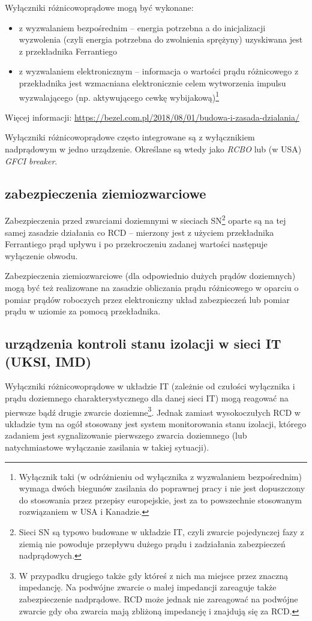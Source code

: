 Wyłączniki różnicowoprądowe mogą być wykonane:
\begin{itemize}
	\item z wyzwalaniem bezpośrednim – energia potrzebna a do inicjalizacji wyzwolenia (czyli energia potrzebna do zwolnienia sprężyny) uzyskiwana jest z przekładnika Ferrantiego
	\item z wyzwalaniem elektronicznym – informacja o wartości prądu różnicowego z przekładnika jest wzmacniana elektronicznie celem wytworzenia impulsu wyzwalającego (np. aktywującego cewkę wybijakową)\footnote{
		Wyłącznik taki (w odróżnieniu od wyłącznika z wyzwalaniem bezpośrednim) wymaga dwóch biegunów zasilania do poprawnej pracy i nie jest dopuszczony do stosowania przez przepisy europejskie,
		jest za to powszechnie stosowanym rozwiązaniem w USA i Kanadzie.
	}
\end{itemize}
Więcej informacji: \url{https://bezel.com.pl/2018/08/01/budowa-i-zasada-dzialania/}

Wyłączniki różnicowoprądowe często integrowane są z wyłącznikiem nadprądowym w jedno urządzenie.
Określane są wtedy jako \textit{RCBO} lub (w USA) \textit{GFCI breaker}.

\subsection{zabezpieczenia ziemiozwarciowe}

Zabezpieczenia przed zwarciami doziemnymi w sieciach SN\footnote{Sieci SN są typowo budowane w układzie IT, czyli zwarcie pojedynczej fazy z ziemią nie powoduje przepływu dużego prądu i zadziałania zabezpieczeń nadprądowych.} oparte są na tej samej zasadzie działania co RCD – mierzony jest z użyciem przekładnika Ferrantiego prąd upływu i po przekroczeniu zadanej wartości następuje wyłączenie obwodu.

Zabezpieczenia ziemiozwarciowe (dla odpowiednio dużych prądów doziemnych) mogą być też realizowane na zasadzie obliczania prądu różnicowego w oparciu o pomiar prądów roboczych przez elektroniczny układ zabezpieczeń lub pomiar prądu w uziomie za pomocą przekładnika. %

\subsection{urządzenia kontroli stanu izolacji w sieci IT (UKSI, IMD)}

Wyłączniki różnicowoprądowe w układzie IT (zależnie od czułości wyłącznika i prądu doziemnego charakterystycznego dla danej sieci IT) mogą reagować na pierwsze bądź drugie zwarcie doziemne\footnote{
	W przypadku drugiego także gdy któreś z nich ma miejsce przez znaczną impedancję. Na podwójne zwarcie o małej impedancji zareaguje także zabezpieczenie nadprądowe.
	RCD może jednak nie zareagować na podwójne zwarcie gdy oba zwarcia mają zbliżoną impedancję i znajdują się za RCD.
}.
Jednak zamiast wysokoczułych RCD w układzie tym na ogół stosowany jest system monitorowania stanu izolacji, którego zadaniem jest sygnalizowanie pierwszego zwarcia doziemnego (lub natychmiastowe wyłączanie zasilania w takiej sytuacji).


